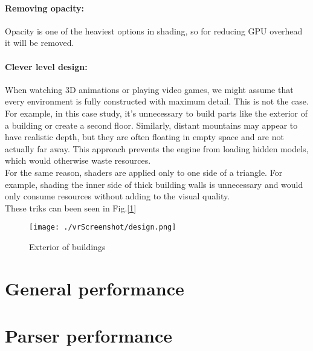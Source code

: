 \paragraph{Removing opacity:}
Opacity is one of the heaviest options in shading, so for reducing GPU overhead it will be removed.

\paragraph{Clever level design:}
When watching 3D animations or playing video games, we might assume that every environment is fully constructed with maximum detail.
This is not the case. For example, in this case study, it's unnecessary to build parts like the exterior of a building or create a second floor.
Similarly, distant mountains may appear to have realistic depth, but they are often floating in empty space and are not actually far away.
This approach prevents the engine from loading hidden models, which would otherwise waste resources.\\
For the same reason, shaders are applied only to one side of a triangle.
For example, shading the inner side of thick building walls is unnecessary and would only consume resources without adding to the visual quality.\\
These triks can been seen in Fig.[\ref{fig:design}]



\begin{figure}[ht]
  \texttt{[image: ./vrScreenshot/design.png]}
  \caption{Exterior of buildings}
  \label{fig:design}
\end{figure}

\section{General performance}


\section{Parser performance}


